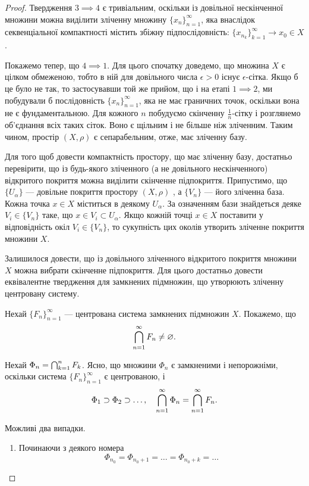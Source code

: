 \begin{proof}
Твердження $3 \implies 4$ є тривіальним, оскільки із довільної
нескінченної множини можна виділити зліченну множину
$\{x_n\}_{n = 1}^\infty$, яка внаслідок секвенціальної компактності містить
збіжну підпослідовність: $\{x_{n_k}\}_{k = 1}^\infty \to x_0 \in X$.

Покажемо тепер, що $4 \implies 1$. Для цього спочатку
доведемо, що множина $X$ є цілком обмеженою, тобто в ній
для довільного числа $\epsilon > 0$ існує $\epsilon$-сітка. Якщо б це було не
так, то застосувавши той же прийом, що і на етапі $1 \implies 2$, ми
побудували б послідовність $\{x_n\}_{n = 1}^\infty$, яка не має граничних
точок, оскільки вона не є фундаментальною. Для кожного $n$
побудуємо скінченну $\frac{1}{n}$-сітку і розглянемо об’єднання всіх
таких сіток. Воно є щільним і не більше ніж зліченним.
Таким чином, простір $(X, \rho)$ є сепарабельним, отже, має
зліченну базу.

Для того щоб довести компактність простору, що має
зліченну базу, достатньо перевірити, що із будь-якого
зліченного (а не довільного нескінченного) відкритого
покриття можна виділити скінченне підпокриття.
Припустимо, що $\{U_\alpha\}$ --- довільне покриття простору
$(X, \rho)$ , а $\{V_n\}$ --- його зліченна база. Кожна точка $x \in X$
міститься в деякому $U_\alpha$. За означенням бази знайдеться
деяке $V_i \in \{V_n\}$ таке, що $x \in V_i \subset U_\alpha$. Якщо кожній точці
$x \in X$ поставити у відповідність окіл $V_i \in \{V_n\}$, то
сукупність цих околів утворить зліченне покриття
множини $X$.

Залишилося довести, що із довільного зліченного
відкритого покриття множини $X$ можна вибрати скінченне
підпокриття. Для цього достатньо довести еквівалентне
твердження для замкнених підмножин, що утворюють
зліченну центровану систему.

Нехай $\{F_n\}_{n = 1}^\infty$ --- центрована система замкнених
підмножин $X$. Покажемо, що
\begin{equation*}
    \operatorname*{\bigcap}_{n = 1}^\infty F_n \ne \varnothing.
\end{equation*}

Нехай $\Phi_n = \operatorname*{\bigcap}_{k = 1}^n F_k$. Ясно, що множини $\Phi_n$ є замкненими і
непорожніми, оскільки система $\{F_n\}_{n = 1}^\infty$ є центрованою, і
\begin{equation*}
    \Phi_1 \supset \Phi_2 \supset \dots, \quad
    \operatorname*{\bigcap}_{n = 1}^\infty \Phi_n = \operatorname*{\bigcap}_{n = 1}^\infty F_n.    
\end{equation*}

Можливі два випадки.
\begin{enumerate}
\item Починаючи з деякого номера
\begin{equation*}
    \Phi_{n_0} = \Phi_{n_0 + 1} = \dots = \Phi_{n_0 + k} = \dots
\end{equation*}


\end{enumerate}
\end{proof}
